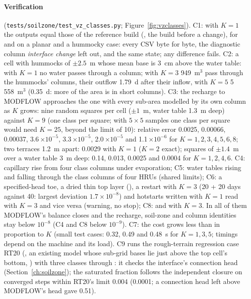 \paragraph{Verification} (\texttt{tests/soilzone/test\_vz\_classes.py}; Figure~\ref{fig:vzclasses}). C1: with $K=1$
the outputs equal those of the reference build (, the build before a change), for  and
 on a planar and a hummocky case: every CSV byte for byte, the diagnostic column \emph{interface change} left
out, and  the same state; any difference fails. C2: a cell with hummocks of $\pm2.5$~m
whose mean base is 3~cm above the water table: with $K=1$ no water passes through a column; with $K=3$ 949~m$^3$ pass
through the hummocks' columns, their outflow 1.79~d after their inflow, with $K=5$ 5\,558~m$^3$ (0.35~d: more of the
area is in short columns). C3: the recharge to MODFLOW approaches the one with every sub-area modelled by its own column
as $K$ grows: nine random squares per cell ($\pm1$~m, water table 1.3~m deep) against $K=9$ (one class per square; with
$5\times5$ samples one class per square would need $K=25$, beyond the limit of 10): relative error 0.0025, 0.00066,
0.00037, 3.6\,$\times10^{-5}$, 3.3\,$\times10^{-5}$, 2.0\,$\times10^{-5}$ and 1.1\,$\times10^{-6}$ for $K=1,2,3,4,5,6,8$;
two terraces 1.2~m apart: 0.0029 with $K=1$ ($K=2$ exact); squares of $\pm1.4$~m over a water table 3~m deep: 0.14,
0.013, 0.0025 and 0.0004 for $K=1,2,4,6$. C4: capillary rise from four class columns under evaporation; C5: water tables
rising and falling through the class columns of four HRUs (shared limits); C6: a specified-head toe, a dried thin top
layer (), a restart with $K=3$ (20 + 20 days against 40: largest deviation $1.7\times10^{-8}$) and hotstarts
written with $K=1$ read with $K=3$ and vice versa (warning, no stop); C8:  and  with $K=3$. In all
of them MODFLOW's balance closes and the recharge, soil-zone and column identities stay below $10^{-8}$ (C4 and C8 below
$10^{-9}$). C7: the cost grows less than in proportion to $K$ (small test cases: 0.32, 0.49 and 0.48~s for $K=1,3,5$;
timings depend on the machine and its load). C9 runs the rough-terrain regression case RT20 (, an existing
model whose sub-grid bases lie just above the top cell's bottom, ) with three classes through
: it checks the interface's connection head (Section~\ref{ch:soilzone}); the saturated
fraction follows the independent closure on converged steps within RT20's limit 0.004 (0.0001; a connection head left above
MODFLOW's head gave 0.51).

